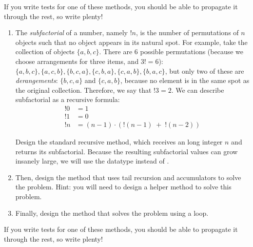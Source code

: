 If you write tests for one of these methods, you should be able to propagate it through the rest, so write plenty!


\begin{enumerate}[label=(\alph*)]
    \item The \textit{subfactorial} of a number, namely $!n$, is the number of permutations of $n$ objects such that no object appears in its natural spot. For example, take the collection of objects $\{a, b, c\}$. There are $6$ possible permutations (because we choose arrangements for three items, and $3!=6$): $\{a, b, c\}, \{a, c, b\}, \{b, c, a\}, \{c, b, a\}, \{c, a, b\}, \{b, a, c\}$, but only two of these are \textit{derangements}: $\{b, c, a\}$ and $\{c, a, b\}$, because no element is in the same spot as the original collection. Therefore, we say that $!3=2$. We can describe subfactorial as a recursive formula:
\begin{align*}
    !0 &= 1\\
    !1 &= 0\\
    !n &= (n-1) \cdot (!(n - 1)\;+\;!(n - 2))
\end{align*}

    Design the standard recursive  method, which receives an long integer $n$ and returns its subfactorial. Because the resulting subfactorial values can grow insanely large, we will use the  datatype instead of .

    \item Then, design the  method that uses tail recursion and accumulators to solve the problem. Hint: you will need to design a  helper method to solve this problem.

    \item Finally, design the  method that solves the problem using a loop.
\end{enumerate}

If you write tests for one of these methods, you should be able to propagate it through the rest, so write plenty!

